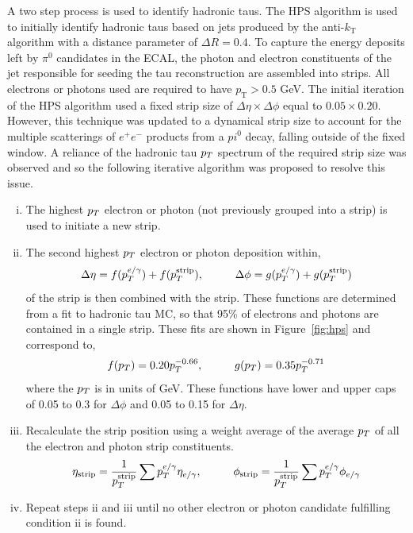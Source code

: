 A two step process is used to identify hadronic taus.
The \ac{HPS} algorithm is used to initially identify hadronic taus based on jets produced by the anti-$k_{\text{T}}$ algorithm with a distance parameter of $\Delta R = 0.4$. 
To capture the energy deposits left by $\pi^0$ candidates in the ECAL, the photon and electron constituents of the jet responsible for seeding the tau reconstruction are assembled into strips. 
All electrons or photons used are required to have $p_{\text{T}} > 0.5$ GeV.
The initial iteration of the \ac{HPS} algorithm used a fixed strip size of $\Delta \eta \times \Delta \phi$ equal to $0.05 \times 0.20$.
However, this technique was updated to a dynamical strip size to account for the multiple scatterings of $e^+ e^-$ products from a $pi^0$ decay, falling outside of the fixed window.
A reliance of the hadronic tau $p_{T}$ spectrum of the required strip size was observed and so the following iterative algorithm was proposed to resolve this issue.

\begin{enumerate}[i)]
\item The highest $p_{T}$ electron or photon (not previously grouped into a strip) is used to initiate a new strip.
\item The second highest $p_{T}$ electron or photon deposition within,
\begin{equation}
  \Delta \eta = f(p_{T}^{e/\gamma}) + f(p_{T}^{\text{strip}}), \hspace{1cm} \Delta \phi = g(p_{T}^{e/\gamma}) + g(p_{T}^{\text{strip}})
\end{equation}
of the strip is then combined with the strip.
These functions are determined from a fit to hadronic tau MC, so that 95\% of electrons and photons are contained in a single strip.
These fits are shown in Figure~\ref{fig:hps} and correspond to,
\begin{equation}
f(p_{T}) = 0.20 p_{T}^{-0.66}, \hspace{1cm} g(p_{T}) = 0.35 p_{T}^{-0.71}
\end{equation}
where the $p_{T}$ is in units of GeV.
These functions have lower and upper caps of 0.05 to 0.3 for $\Delta\phi$ and 0.05 to 0.15 for $\Delta\eta$.
\item Recalculate the strip position using a weight average of the average $p_{T}$ of all the electron and photon strip constituents.
\begin{equation}
\eta_{\text{strip}} = \frac{1}{p_{T}^{\text{strip}}} \sum p_{T}^{e/\gamma} \eta_{e/\gamma}, \hspace{1cm} \phi_{\text{strip}} = \frac{1}{p_{T}^{\text{strip}}} \sum p_{T}^{e/\gamma} \phi_{e/\gamma}
\end{equation}
\item Repeat steps ii and iii until no other electron or photon candidate fulfilling condition ii is found.
\end{enumerate}

